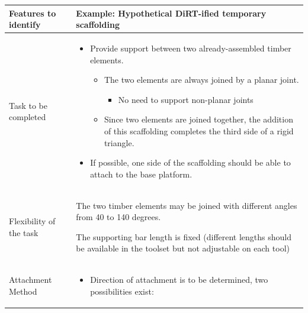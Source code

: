 \documentclass[11pt]{book}
\begin{document}
\begin{table}[H]
\begin{adjustbox}{max width=\textwidth}
\begin{tabular}{p{3.52cm}p{12.35cm}}
\hline
\multicolumn{1}{|p{3.52cm}}{{\footnotesize \textbf{Features to identify}}} & 
\multicolumn{1}{|p{12.35cm}|}{{\footnotesize \textbf{Example: Hypothetical DiRT-ified temporary scaffolding }}} \\ 
\hline
\multicolumn{1}{|p{3.52cm}}{{\footnotesize Task to be completed}} & 
\multicolumn{1}{|p{12.35cm}|}{\begin{itemize}
	\item {\footnotesize Provide support between two already-assembled timber elements. } \newline
\begin{itemize}
	\item {\footnotesize The two elements are always joined by a planar joint. } \newline
\begin{itemize}
	\item {\footnotesize No need to support non-planar joints } \newline
\end{itemize}
	\item {\footnotesize Since two elements are joined together, the addition of this scaffolding completes the third side of a rigid triangle.\par} \newline
\end{itemize}
	\item {\footnotesize If possible, one side of the scaffolding should be able to attach to the base platform.}\end{itemize}
} \\ 
\hline
\multicolumn{1}{|p{3.52cm}}{{\footnotesize Flexibility of the task}} & 
\multicolumn{1}{|p{12.35cm}|}{	\item {\footnotesize The two timber elements may be joined with different angles from 40 to 140 degrees.} \newline
	\item {\footnotesize The supporting bar length is fixed (different lengths should be available in the toolset but not adjustable on each tool)\par}} \\ 
\hline
\multicolumn{1}{|p{3.52cm}}{{\footnotesize Attachment Method}} & 
\multicolumn{1}{|p{12.35cm}|}{\begin{itemize}
	\item {\footnotesize Direction of attachment is to be determined, two possibilities exist:} \newline

\end{itemize}}
\end{tabular}
\end{adjustbox}
\end{table}
\end{document}
